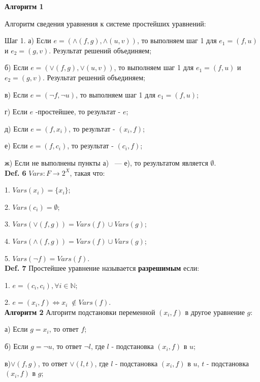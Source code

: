 \documentclass[12pt]{article}
\begin{document}
     \hypertarget{a1}{{\bf Алгоритм 1}}
     Алгоритм сведения уравнения к системе простейших уравнений:
     
     Шаг 1. а) Если $e=(\wedge(f,g),\wedge(u,v))$, то выполняем шаг 1 для $e_{1}=(f,u)$ и $e_{2}=(g,v)$. Результат решений объединяем;
     
     б) Если $e=(\vee(f,g),\vee(u,v))$, то выполняем шаг 1 для $e_{1}=(f,u)$ и $e_{2}=(g,v)$. Результат решений объединяем;
     
     в) Если $e=(\neg f,\neg u)$, то выполняем шаг 1 для $e_{1}=(f,u)$;
     
     г) Если $e$ -простейшее, то результат - $e$;
     
     д) Если $e=(f,x_{i})$, то результат - $(x_{i}, f)$; 
     
     е) Если $e=(f,c_{i})$, то результат - $(c_{i}, f)$; 
     
     ж) Если не выполнены пункты а) ~--- \; е), то результатом является $  \emptyset $.
     \\  
        
     {\bf Def. 6} $Vars:F \rightarrow 2^{X}$, такая что:
     
     1. $Vars(x_{i})= \lbrace x_{i} \rbrace$;
     
     2. $Vars(c_{i})=  \emptyset$;
     
     3. $Vars(\vee(f,g))= Vars(f)\cup Vars(g)$;
     
     4. $Vars(\wedge(f,g))= Vars(f)\cup Vars(g)$;
     
     5. $Vars(\neg f)= Vars(f)$.
     \\
     
     {\bf Def. 7} Простейшее уравнение называется {\bf разрешимым} если:
     
     1. $e =(c_{i},c_{i}), \forall i \in \mathbb{N}$;
     
     2. $e =(x_{i},f) \Leftrightarrow x_{i} \;\notin Vars(f)$.
     \\
     
    \hypertarget{a2}{{\bf Алгоритм 2}} Алгоритм подстановки переменной $ (x_{i},f) $ в другое уравнение $g$: 
    
    
    а) Если $g = x_{i}$, то ответ  $f$;
    
    б) Если $g = \neg{u}$, то ответ $\neg{l}$, где $l$ - подстановка $ (x_{i},f) $ в $u$;
    
    в)$\vee (f, g)$, то ответ $\vee(l,t)$, где $l$ - подстановка $ (x_{i},f) $ в $u$,  $t$ - подстановка $ (x_{i},f) $ в $g$;
    
\end{document}
